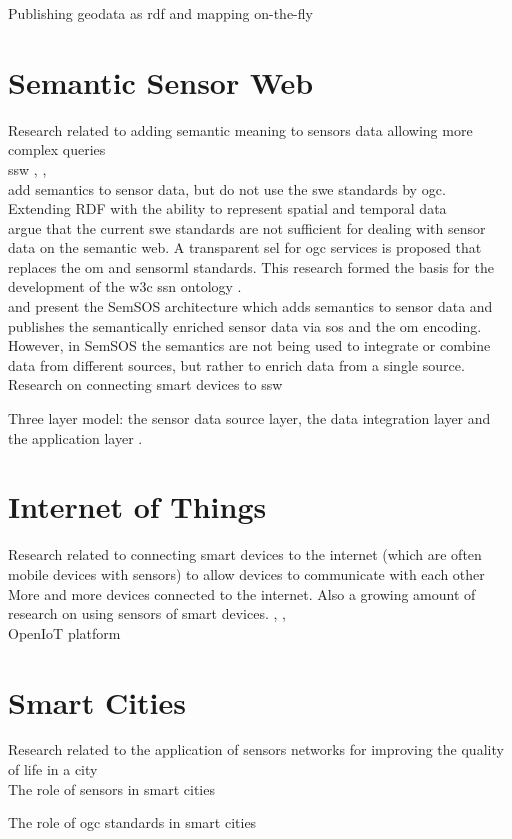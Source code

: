 Publishing geodata as \ac{rdf} and mapping on-the-fly \citep{LD:Missier}


\section{Semantic Sensor Web}
Research related to adding semantic meaning to sensors data allowing more complex queries \\ 

\ac{ssw} \citep{SSW:Sheth}, \citep{SSW:deMel}, \citep{SSW:Bakillah} \\ 

\cite{SSW:Huang} add semantics to sensor data, but do not use the \ac{swe} standards by \ac{ogc}. \\ 

Extending RDF with the ability to represent spatial and temporal data \citep{SSW:Koubarakis} \\ 

\cite{SSW:Janowicz2} argue that the current \ac{swe} standards are not sufficient for dealing with sensor data on the semantic web. A transparent \ac{sel} for \ac{ogc} services is proposed that replaces the \ac{om} and \ac{sensorml} standards. This research formed the basis for the development of the \ac{w3c} \ac{ssn} ontology \citep{SSW:SSN_incubatorGroup}. \\ 

\cite{SSW:Henson} and \cite{SSW:Pschorr} present the SemSOS architecture which adds semantics to sensor data and publishes the semantically enriched sensor data via \ac{sos} and the \ac{om} encoding. However, in SemSOS the semantics are not being used to integrate or combine data from different sources, but rather to enrich data from a single source. \\ 

Research on connecting smart devices to \ac{ssw} \citep{SSW:Vera}  

Three layer model: the sensor data source layer, the data integration layer and the application layer \cite{SSW:Wang}.

\section{Internet of Things}
Research related to connecting smart devices to the internet (which are often mobile devices with sensors) to allow devices to communicate with each other \\

More and more devices connected to the internet. Also a growing amount of research on using sensors of smart devices. \citep{IOT:Waher}, \citep{IOT:Zarko}, \citep{SSW:Calbimonte} \\


OpenIoT platform \citep{IOT:Calbimonte}


\section{Smart Cities}
Research related to the application of sensors networks for improving the quality of life in a city \\ 

The role of sensors in smart cities \citep{IOT:Zanelli}

The role of \ac{ogc} standards in smart cities \citep{SC:OGC}
